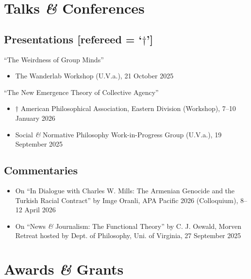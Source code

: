 \documentclass[10pt]{article}
\begin{document}
\section*{Talks \emph{\&} Conferences}

\subsection*{Presentations [refereed = `\begin{math}\dagger\end{math}']}

“The Weirdness of Group Minds''
\begin{itemize}
\item The Wanderlab Workshop (U.V.a.), 21 October 2025
\end{itemize}

“The New Emergence Theory of Collective Agency''
\begin{itemize}
\item \begin{math}\dagger\end{math} American Philosophical Association, Eastern Division (Workshop), 7--10 January 2026
\item Social \emph{\&} Normative Philosophy Work-in-Progress Group (U.V.a.), 19 September 2025
\end{itemize}

\subsection*{Commentaries}

\begin{itemize}
\item On ``In Dialogue with Charles W. Mills: The Armenian Genocide and the Turkish Racial Contract'' by Imge Oranli, APA Pacific 2026 (Colloquium), 8--12 April 2026\medskip
\item On ``News \emph{\&} Journalism: The Functional Theory'' by C. J. Oswald, Morven Retreat hosted by Dept. of Philosophy, Uni. of Virginia, 27 September 2025
\end{itemize}


\section*{Awards \emph{\&} Grants}
\end{document}
